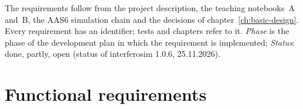 
The requirements follow from the project description, the teaching
notebooks~A and~B, the AAS6 simulation chain and the decisions of
chapter~\ref{ch:basic-design}. Every requirement has an identifier;
tests and chapters refer to it. \emph{Phase} is the phase of the
development plan in which the requirement is implemented; \emph{Status}:
done, partly, open (status of interferosim 1.0.6, 25.11.2026).

\section{Functional requirements}

